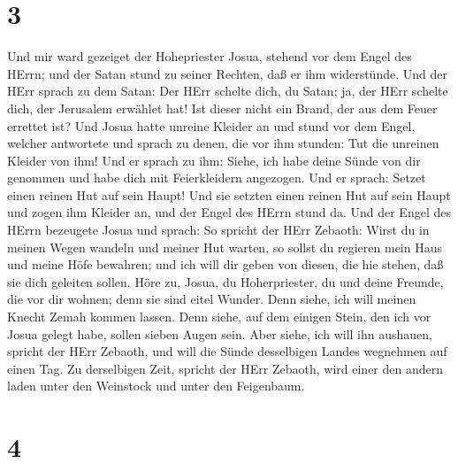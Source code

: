\hypertarget{section-2}{%
\section{3}\label{section-2}}

 Und mir ward gezeiget der Hohepriester Josua, stehend vor
dem Engel des HErrn; und der Satan stund zu seiner Rechten, daß er ihm
widerstünde.  Und der HErr sprach zu dem Satan: Der HErr
schelte dich, du Satan; ja, der HErr schelte dich, der Jerusalem
erwählet hat! Ist dieser nicht ein Brand, der aus dem Feuer errettet
ist?  Und Josua hatte unreine Kleider an und stund vor dem
Engel,  welcher antwortete und sprach zu denen, die vor ihm
stunden: Tut die unreinen Kleider von ihm! Und er sprach zu ihm: Siehe,
ich habe deine Sünde von dir genommen und habe dich mit Feierkleidern
angezogen.  Und er sprach: Setzet einen reinen Hut auf sein
Haupt! Und sie setzten einen reinen Hut auf sein Haupt und zogen ihm
Kleider an, und der Engel des HErrn stund da.  Und der Engel
des HErrn bezeugete Josua und sprach:  So spricht der HErr
Zebaoth: Wirst du in meinen Wegen wandeln und meiner Hut warten, so
sollst du regieren mein Haus und meine Höfe bewahren; und ich will dir
geben von diesen, die hie stehen, daß sie dich geleiten sollen.
 Höre zu, Josua, du Hoherpriester, du und deine Freunde, die
vor dir wohnen; denn sie sind eitel Wunder. Denn siehe, ich will meinen
Knecht Zemah kommen lassen.  Denn siehe, auf dem einigen
Stein, den ich vor Josua gelegt habe, sollen sieben Augen sein. Aber
siehe, ich will ihn aushauen, spricht der HErr Zebaoth, und will die
Sünde desselbigen Landes wegnehmen auf einen Tag.  Zu
derselbigen Zeit, spricht der HErr Zebaoth, wird einer den andern laden
unter den Weinstock und unter den Feigenbaum.

\hypertarget{section-3}{%
\section{4}\label{section-3}}


